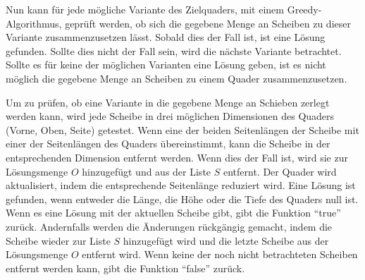 \documentclass[a4paper,10pt,ngerman]{scrartcl}
\begin{document}
    Nun kann für jede mögliche Variante des Zielquaders, mit einem Greedy-Algorithmus, geprüft werden,
    ob sich die gegebene Menge an Scheiben zu dieser Variante zusammenzusetzen lässt.
    Sobald dies der Fall ist, ist eine Lösung gefunden.
    Sollte dies nicht der Fall sein, wird die nächste Variante betrachtet.
    Sollte es für keine der möglichen Varianten eine Lösung geben, ist es nicht möglich die gegebene Menge an Scheiben
    zu einem Quader zusammenzusetzen.

    Um zu prüfen, ob eine Variante in die gegebene Menge an Schieben zerlegt werden kann, wird jede
    Scheibe in drei möglichen Dimensionen des Quaders (Vorne, Oben, Seite) getestet.
    Wenn eine der beiden Seitenlängen der Scheibe mit einer der Seitenlängen des Quaders übereinstimmt,
    kann die Scheibe in der entsprechenden Dimension entfernt werden.
    Wenn dies der Fall ist, wird sie zur Lösungsmenge $O$ hinzugefügt und aus der Liste $S$ entfernt.
    Der Quader wird aktualisiert, indem die entsprechende Seitenlänge reduziert wird.
    Eine Lösung ist gefunden, wenn entweder die Länge, die Höhe oder die Tiefe des Quaders null ist.
    Wenn es eine Lösung mit der aktuellen Scheibe gibt, gibt die Funktion ``true'' zurück.
    Andernfalls werden die Änderungen rückgängig gemacht, indem die Scheibe wieder zur Liste $S$ hinzugefügt wird
    und die letzte Scheibe aus der Lösungsmenge $O$ entfernt wird.
    Wenn keine der noch nicht betrachteten Scheiben entfernt werden kann, gibt die Funktion ``false'' zurück.
\end{document}
